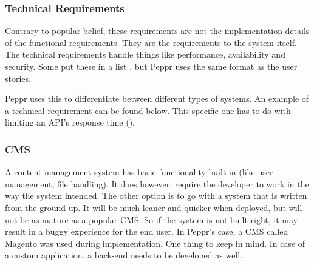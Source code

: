 \subsubsection{Technical Requirements}
Contrary to popular belief, these requirements are not the implementation details of the functional requirements. They are the requirements to the system itself. The technical requirements handle things like performance, availability and security. Some put these in a list \cite{agileTechnicalRequirements}, but Peppr uses the same format as the user stories. \newline


\newline

Peppr uses this to differentiate between different types of systems. An example of a technical requirement can be found below. This specific one has to do with limiting an API's response time (\cite{responseTimes}).

\newline

\subsubsection{CMS}
A content management system has basic functionality built in (like user management, file handling). It does however, require  the developer to work in the way the system intended. The other option is to go with a system that is written from the ground up. It will be much leaner and quicker when deployed, but will not be as mature as a popular CMS. So if the system is not built right, it may result in a buggy experience for the end user. In Peppr's case, a CMS called Magento was used during implementation. One thing to keep in mind. In case of a custom application, a back-end needs to be developed as well.
